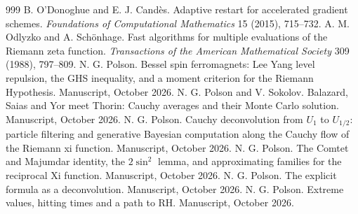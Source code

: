 \begin{thebibliography}{999}
 B. O'Donoghue and E. J. Cand\`es. Adaptive restart for accelerated gradient schemes. \emph{Foundations of Computational Mathematics} 15 (2015), 715--732.
 A. M. Odlyzko and A. Sch\"onhage. Fast algorithms for multiple evaluations of the Riemann zeta function. \emph{Transactions of the American Mathematical Society} 309 (1988), 797--809.
 N. G. Polson. Bessel spin ferromagnets: Lee Yang level repulsion, the GHS inequality, and a moment criterion for the Riemann Hypothesis. Manuscript, October 2026.
 N. G. Polson and V. Sokolov. Balazard, Saias and Yor meet Thorin: Cauchy averages and their Monte Carlo solution. Manuscript, October 2026.
 N. G. Polson. Cauchy deconvolution from $U_1$ to $U_{1/2}$: particle filtering and generative Bayesian computation along the Cauchy flow of the Riemann xi function. Manuscript, October 2026.
 N. G. Polson. The Comtet and Majumdar identity, the $2\sin^2$ lemma, and approximating families for the reciprocal Xi function. Manuscript, October 2026.
 N. G. Polson. The explicit formula as a deconvolution. Manuscript, October 2026.
 N. G. Polson. Extreme values, hitting times and a path to RH. Manuscript, October 2026.

\end{thebibliography}
